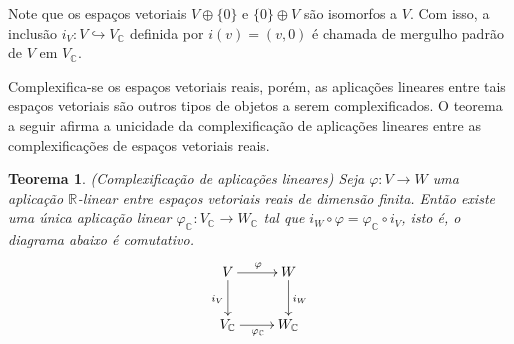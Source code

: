 \documentclass[12pt]{book}
\newtheorem{teorema}{Teorema}[section]
\newcommand{\complexificacao}[1]{#1_{\complexo{}}}
\newcommand{\complexo}[1]{\mathbb{C}^{#1}}
\newcommand{\real}[1]{\mathbb{R}^{#1}}
\newcommand{\reta}{\real{}}
\begin{document}
	Note que os espaços vetoriais $V\oplus\{0\}$ e $\{0\}\oplus V$ são isomorfos a $V$. Com isso, a inclusão $i_{V} :V \hookrightarrow \complexificacao{V}$ definida por $i(v) = (v, 0)$ é chamada de mergulho padrão de $V$ em $\complexificacao{V}$.
	
	Complexifica-se os espaços vetoriais reais, porém, as aplicações lineares entre tais espaços vetoriais são outros tipos de objetos a serem complexificados. O teorema a seguir afirma a unicidade da complexificação de aplicações lineares entre as complexificações de espaços vetoriais reais.
	
	\begin{teorema}
		(Complexificação de aplicações lineares) Seja $\varphi : V \to W$ uma aplicação
		$\reta$-linear entre espaços vetoriais reais de dimensão finita. Então existe uma única aplicação linear $\complexificacao{\varphi}:\complexificacao{V} \to \complexificacao{W}$ tal que $i_{W}\circ \varphi = \complexificacao{\varphi} \circ i_{V}$, isto é, o diagrama abaixo é comutativo.
		$$
		\xymatrix{
			V\ar[d]_{i_{V}}\ar[r]^{\varphi} & W\ar[d]^{i_{W}} 
			\\
			\complexificacao{V} \ar[r]_{\complexificacao{\varphi}}&\complexificacao{W} 
		}
		$$
	\end{teorema}
\end{document}
